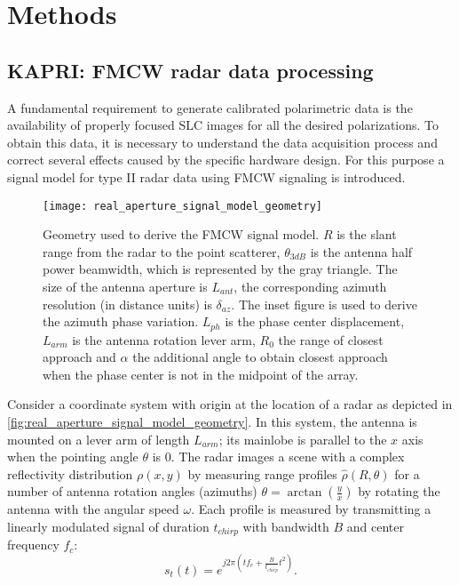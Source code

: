 \section{Methods}\label{sec:methods}
\subsection{KAPRI: FMCW radar data processing}\label{sec:proc_SLC}
A fundamental requirement to generate calibrated polarimetric data is the availability of properly focused SLC images for all the desired polarizations. To obtain this data, it is necessary to understand the data acquisition process and correct several effects caused by the specific hardware design.  
For this purpose a signal model for type II\cite{Caduff2015} radar data using FMCW signaling\cite{Stove1992} is introduced.\\
\begin{figure}[h]
	\centering
	\texttt{[image: real\_aperture\_signal\_model\_geometry]}
	\caption{Geometry used to derive the FMCW signal model. $R$ is the slant range from the radar to the point scatterer, $\theta_{3dB}$ is the antenna half power beamwidth, which is represented by the gray triangle. The size of the antenna aperture is $L_{ant}$, the corresponding azimuth resolution (in distance units) is $\delta_{az}$. The inset figure is used to derive the azimuth phase variation. $L_{ph}$ is the phase center displacement, $L_{arm}$ is the antenna rotation lever arm, $R_{0}$ the range of closest approach and $\alpha$ the additional angle to obtain closest approach when the phase center is not in the midpoint of the array.}
	\label{fig:real_aperture_signal_model_geometry}
\end{figure}
Consider a coordinate system with origin at the location of a radar as depicted in \autoref{fig:real_aperture_signal_model_geometry}. In this system, the antenna is mounted on a lever arm of length $L_{arm}$; its mainlobe is parallel to the $x$ axis when the pointing angle $\theta$ is 0. The radar images a scene with a complex reflectivity distribution $\rho\left(x,y\right)$ by measuring range profiles $\hat{\rho}\left(R, \theta\right)$ for a number of antenna rotation angles (azimuths) $\theta = \operatorname{arctan}\left(\frac{y}{x}\right)$ by rotating the antenna with the angular speed $\omega$. Each profile is measured by transmitting a linearly modulated signal of duration $t_{chirp}$ with bandwidth $B$ and center frequency $f_c$:\\
\begin{equation}
	s_t\left(t\right) = e^{j 2 \pi \left( t f_{c} +  \frac{B}{t_{chirp}} t^2 \right)}.
\end{equation}
